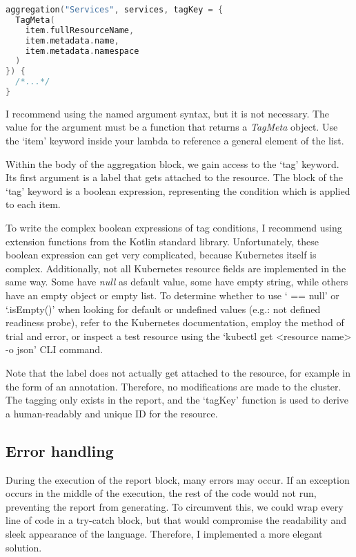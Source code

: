 \begin{lstlisting}[caption={Override tagKey},language=Kotlin,label=code:tagkey]
aggregation("Services", services, tagKey = {
  TagMeta(
    item.fullResourceName,
    item.metadata.name,
    item.metadata.namespace
  )
}) {
  /*...*/
}
\end{lstlisting}

I recommend using the named argument syntax, but it is not necessary. The value for the argument must be a function that returns a \emph{TagMeta} object. Use the `item' keyword inside your lambda to reference a general element of the list.

Within the body of the aggregation block, we gain access to the `tag' keyword. Its first argument is a label that gets attached to the resource. The block of the `tag' keyword is a boolean expression, representing the condition which is applied to each item.

To write the complex boolean expressions of tag conditions, I recommend using extension functions from the Kotlin standard library. Unfortunately, these boolean expression can get very complicated, because Kubernetes itself is complex. Additionally, not all Kubernetes resource fields are implemented in the same way. Some have \emph{null} as default value, some have empty string, while others have an empty object or empty list. To determine whether to use ` == null' or `.isEmpty()' when looking for default or undefined values (e.g.: not defined readiness probe), refer to the Kubernetes documentation, employ the method of trial and error, or inspect a test resource using the `kubectl get <resource name> -o json' CLI command.

Note that the label does not actually get attached to the resource, for example in the form of an annotation. Therefore, no modifications are made to the cluster. The tagging only exists in the report, and the `tagKey' function is used to derive a human-readably and unique ID for the resource.

\subsection{Error handling}

During the execution of the report block, many errors may occur. If an exception occurs in the middle of the execution, the rest of the code would not run, preventing the report from generating. To circumvent this, we could wrap every line of code in a try-catch block, but that would compromise the readability and sleek appearance of the language. Therefore, I implemented a more elegant solution.

